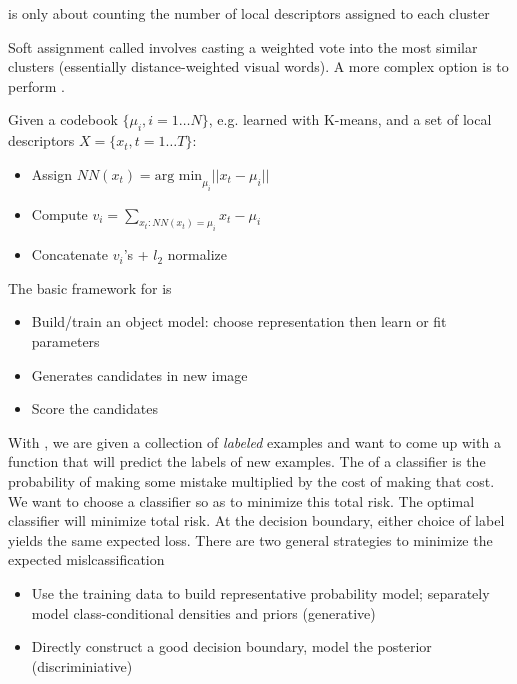 \documentclass{article}
\begin{document}
\begin{remark}
   is only about counting the number of local descriptors assigned to each cluster
\end{remark}

Soft assignment called  involves casting a weighted vote into the most similar clusters (essentially distance-weighted visual words). A more complex option is to perform . 

\begin{definition}
  Given a codebook $\{\mu_i , i = 1 \dots N\}$, e.g. learned with K-means, and a set of local descriptors $X = \{x_t , t = 1 \dots T\}$: 
  \begin{itemize}
    \item Assign $NN (x_t) = \textrm{arg min}_{\mu_i} ||x_t - \mu_i ||$
    \item Compute $v_i = \sum_{x_t : NN(x_t) = \mu_i} x_t - \mu_i$
    \item Concatenate $v_i$'s + $l_2$ normalize
  \end{itemize}
\end{definition}

The basic framework for  is
\begin{itemize}
  \item Build/train an object model: choose representation then learn or fit parameters
  \item Generates candidates in new image 
  \item Score the candidates
\end{itemize}

With , we are given a collection of \emph{labeled} examples and want to come up with a function that will predict the labels of new examples. The  of a classifier is the probability of making some mistake multiplied by the cost of making that cost. We want to choose a classifier so as to minimize this total risk. The optimal classifier will minimize total risk. At the decision boundary, either choice of label yields the same expected loss. There are two general strategies to minimize the expected mislcassification 
\begin{itemize}
  \item Use the training data to build representative probability model; separately model class-conditional densities and priors (generative)
  \item Directly construct a good decision boundary, model the posterior (discriminiative)
\end{itemize}
\end{document}
